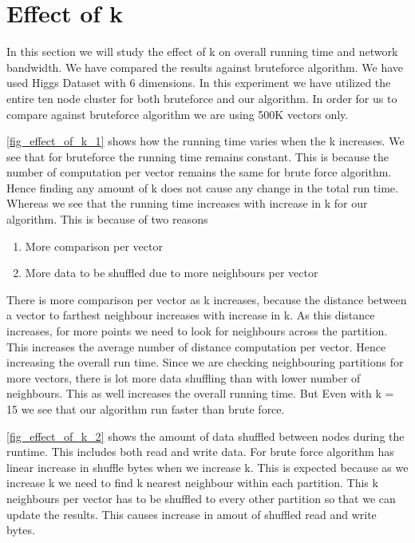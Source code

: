 \section{Effect of k}

In this section we will study the effect of k on overall running
time and network bandwidth. We have compared the results against bruteforce algorithm.
We have used Higgs Dataset with 6 dimensions. In this experiment we
have utilized the entire ten node cluster for both bruteforce and our
algorithm. In order for us to compare against bruteforce algorithm we are using
500K vectors only.

\cref{fig_effect_of_k_1} shows how
the running time varies when the k increases. We see that for
bruteforce the running time remains constant. This is because the
number of computation per vector remains the same for brute force
algorithm. Hence finding any amount of k does not
cause any change in the total run time. Whereas we see that the
running time increases with increase in k for our algorithm. This is
because of two reasons
\begin{enumerate}
\item More comparison per vector
\item More data to be shuffled due to more neighbours per vector
\end{enumerate}

There is more comparison per vector as k increases, because the distance between a vector to
farthest neighbour increases with increase in k. As this distance increases, for more
points we need to look for neighbours across the partition. This
increases the average number of distance computation per vector. Hence
increasing the overall run time. Since we are checking neighbouring
partitions for more vectors, there is lot more data shuffling than
with lower number of neighbours. This as well increases the overall
running time. But Even with k = 15 we see that our
algorithm run faster than brute force.

\cref{fig_effect_of_k_2} shows the amount of data
shuffled between nodes during the runtime. This includes both read and
write data. For brute force algorithm has
linear increase in shuffle bytes when we increase k. This is expected
because as we increase k we need to find k nearest neighbour within
each partition. This k neighbours per vector has to be shuffled to every
other partition so that we can update the results. This causes
increase in amout of shuffled read and write bytes.

